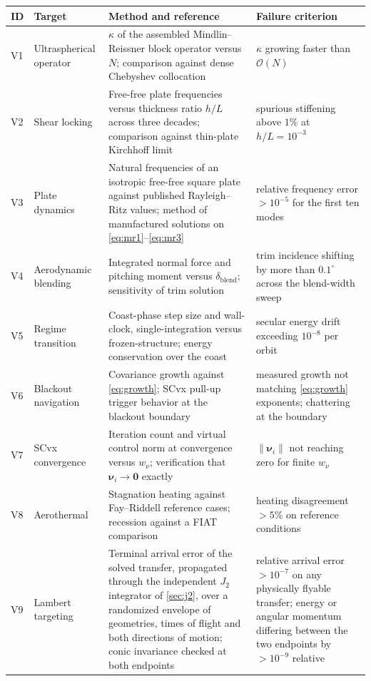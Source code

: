 \documentclass[11pt,a4paper]{article}
\theoremstyle{definition}
\numberwithin{equation}{section}
\begin{document}
\begin{center}
\begin{longtable}{@{}llp{5.4cm}p{3.4cm}@{}}
\toprule
\textbf{ID} & \textbf{Target} & \textbf{Method and reference} & \textbf{Failure criterion} \\
\midrule
\endhead
V1 & Ultraspherical operator & $\kappa$ of the assembled Mindlin--Reissner block operator versus $N$; comparison against dense Chebyshev collocation & $\kappa$ growing faster than $\mathcal{O}(N)$ \\
\addlinespace
V2 & Shear locking & Free-free plate frequencies versus thickness ratio $h/L$ across three decades; comparison against thin-plate Kirchhoff limit & spurious stiffening above $1\%$ at $h/L = 10^{-3}$ \\
\addlinespace
V3 & Plate dynamics & Natural frequencies of an isotropic free-free square plate against published Rayleigh--Ritz values; method of manufactured solutions on \cref{eq:mr1}--\cref{eq:mr3} & relative frequency error $> 10^{-5}$ for the first ten modes \\
\addlinespace
V4 & Aerodynamic blending & Integrated normal force and pitching moment versus $\delta_{\text{blend}}$; sensitivity of trim solution & trim incidence shifting by more than $0.1^\circ$ across the blend-width sweep \\
\addlinespace
V5 & Regime transition & Coast-phase step size and wall-clock, single-integration versus frozen-structure; energy conservation over the coast & secular energy drift exceeding $10^{-8}$ per orbit \\
\addlinespace
V6 & Blackout navigation & Covariance growth against \cref{eq:growth}; SCvx pull-up trigger behavior at the blackout boundary & measured growth not matching \cref{eq:growth} exponents; chattering at the boundary \\
\addlinespace
V7 & SCvx convergence & Iteration count and virtual control norm at convergence versus $w_\nu$; verification that $\bm{\nu}_i \to \mathbf{0}$ exactly & $\|\bm{\nu}_i\|$ not reaching zero for finite $w_\nu$ \\
\addlinespace
V8 & Aerothermal & Stagnation heating against Fay--Riddell reference cases; recession against a FIAT \cite{chen1999} comparison & heating disagreement $> 5\%$ on reference conditions \\
\addlinespace
V9 & Lambert targeting & Terminal arrival error of the solved transfer, propagated through the independent $J_2$ integrator of \cref{sec:j2}, over a randomized envelope of geometries, times of flight and both directions of motion; conic invariance checked at both endpoints & relative arrival error $> 10^{-7}$ on any physically flyable transfer; energy or angular momentum differing between the two endpoints by $> 10^{-9}$ relative \\

\end{longtable}
\end{center}
\end{document}
